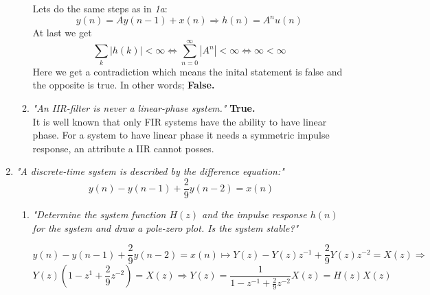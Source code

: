 \documentclass{article}
\begin{document}
\begin{enumerate}
\begin{enumerate}
                Lets do the same steps as in \emph{1a}:
                $$
                   y(n) = Ay(n-1) + x(n) \Rightarrow h(n) = A^nu(n)
                $$
                At last we get
                $$
                  \sum_k |h(k)| < \infty \Leftrightarrow \sum_{n=0}^{\infty}|A^n| < \infty \Leftrightarrow \infty < \infty
                $$
                Here we get a contradiction which means the inital statement is false and the opposite is true. In other words; \textbf{False.}
                
            \item %
                \emph{"An IIR-filter is never a linear-phase system."}
                \textbf{True.} 
                \\
                It is well known that only FIR systems have the ability to have linear phase. For a system to have linear phase it needs a symmetric impulse response, an attribute a IIR cannot posses.
        \end{enumerate} %
    \item %
        \emph{"A discrete-time system is described by the difference equation:"}
        $$
            y(n)-y(n-1) + \frac{2}{9}y(n-2) = x(n)
        $$
        \begin{enumerate}
            \item %
                \emph{"Determine the system function $H(z)$ and the impulse response $h(n)$ for the system and draw a pole-zero plot. Is the system stable?"}
                
                $$
                    y(n)-y(n-1) + \frac{2}{9}y(n-2) = x(n) \longmapsto 
                    Y(z) - Y(z)z^{-1} + \frac{2}{9} Y(z)z^{-2} = X(z) \Rightarrow
                $$ $$
                    Y(z)(1 - z^{1} + \frac{2}{9} z^{-2}) = X(z) \Rightarrow
                    Y(z) = \frac{1}{1 - z^{-1} + \frac{2}{9}z^{-2}} X(z) = H(z)X(z)
                $$
                

\end{enumerate}
\end{enumerate}
\end{document}
